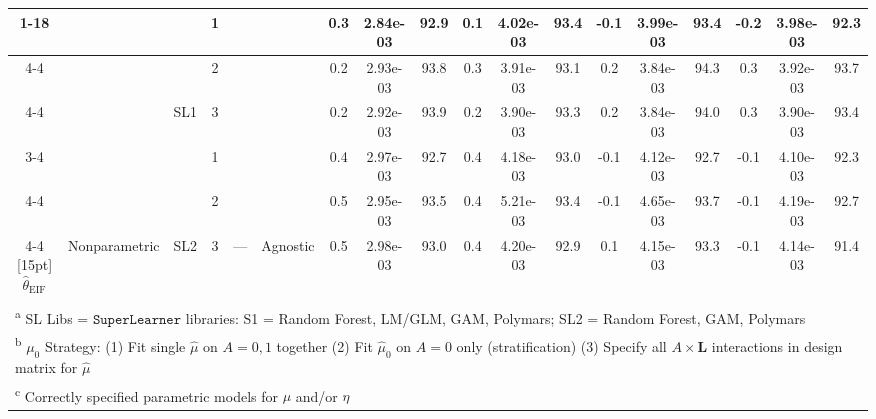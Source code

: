 \begin{table}
\begin{tabular}[t]{ccccccc@{}c@{}cc@{}c@{}cc@{}c@{}cc@{}c@{}c}
\cmidrule{1-18}
 &  &  &  1 &  &  & 0.3 & 2.84e-03 & 92.9 & 0.1 & 4.02e-03 & 93.4 & -0.1 & 3.99e-03 & 93.4 & -0.2 & 3.98e-03 & 92.3\\
\cmidrule{4-4}
\cmidrule{7-18}
 &  &  &  2 &  &  & 0.2 & 2.93e-03 & 93.8 & 0.3 & 3.91e-03 & 93.1 & 0.2 & 3.84e-03 & 94.3 & 0.3 & 3.92e-03 & 93.7\\
\cmidrule{4-4}
\cmidrule{7-18}
 &  & \multirow{-3}{*}[5pt]{\centering\arraybackslash SL1} &  3 &  &  & 0.2 & 2.92e-03 & 93.9 & 0.2 & 3.90e-03 & 93.3 & 0.2 & 3.84e-03 & 94.0 & 0.3 & 3.90e-03 & 93.4\\
\cmidrule{3-4}
\cmidrule{7-18}
 &  &  &  1 &  &  & 0.4 & 2.97e-03 & 92.7 & 0.4 & 4.18e-03 & 93.0 & -0.1 & 4.12e-03 & 92.7 & -0.1 & 4.10e-03 & 92.3\\
\cmidrule{4-4}
\cmidrule{7-18}
 &  &  &  2 &  &  & 0.5 & 2.95e-03 & 93.5 & 0.4 & 5.21e-03 & 93.4 & -0.1 & 4.65e-03 & 93.7 & -0.1 & 4.19e-03 & 92.7\\
\cmidrule{4-4}
\cmidrule{7-18}
\multirow{-6}{*}[15pt]{\centering\arraybackslash $\widehat\theta_\text{EIF}$} & \multirow{-6}{*}[15pt]{\centering\arraybackslash  Nonparametric} & \multirow{-3}{*}[5pt]{\centering\arraybackslash SL2} &  3 & \multirow{-6}{*}[15pt]{\centering\arraybackslash  ---} & \multirow{-6}{*}[15pt]{\centering\arraybackslash  Agnostic} & 0.5 & 2.98e-03 & 93.0 & 0.4 & 4.20e-03 & 92.9 & 0.1 & 4.15e-03 & 93.3 & -0.1 & 4.14e-03 & 91.4\\
\bottomrule\\
\multicolumn{18}{l}{\textsuperscript{a} SL Libs = $\texttt{SuperLearner}$ libraries: S1 = {Random Forest, LM/GLM, GAM, Polymars}; SL2 = {Random Forest, GAM, Polymars}}\\
\multicolumn{18}{l}{\textsuperscript{b} $\mu_0$ Strategy: (1) Fit single $\widehat\mu$ on $A = 0,1$ together (2) Fit $\widehat\mu_0$ on $A = 0$ only (stratification) (3) Specify all $A\times\bm L$ interactions in design matrix for $\widehat\mu$}\\
\multicolumn{18}{l}{\textsuperscript{c} Correctly specified parametric models for $\mu$ and/or $\eta$}\\
\end{tabular}
\end{table}

